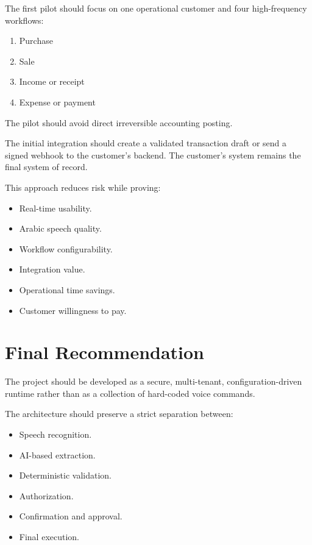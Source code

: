 \documentclass[11pt,a4paper]{article}
\begin{document}
The first pilot should focus on one operational customer and four
high-frequency workflows:

\begin{enumerate}
\item Purchase
\item Sale
\item Income or receipt
\item Expense or payment
\end{enumerate}

The pilot should avoid direct irreversible accounting posting.

The initial integration should create a validated transaction draft or
send a signed webhook to the customer's backend. The customer's system
remains the final system of record.

This approach reduces risk while proving:

\begin{itemize}
\item Real-time usability.
\item Arabic speech quality.
\item Workflow configurability.
\item Integration value.
\item Operational time savings.
\item Customer willingness to pay.
\end{itemize}

\section{Final Recommendation}

The project should be developed as a secure, multi-tenant,
configuration-driven runtime rather than as a collection of hard-coded
voice commands.

The architecture should preserve a strict separation between:

\begin{itemize}
\item Speech recognition.
\item AI-based extraction.
\item Deterministic validation.
\item Authorization.
\item Confirmation and approval.
\item Final execution.
\end{itemize}
\end{document}
